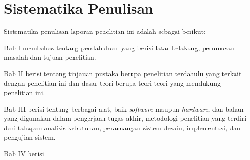 \section{Sistematika Penulisan}

Sistematika penulisan laporan penelitian ini adalah sebagai berikut:

\noindent Bab I membahas tentang pendahuluan yang berisi latar belakang, perumusan masalah 
dan tujuan penelitian. 

\noindent Bab II berisi tentang tinjauan pustaka berupa penelitian terdahulu yang terkait dengan
penelitian ini dan dasar teori berupa teori-teori yang mendukung penelitian ini.

\noindent Bab III berisi tentang berbagai alat, baik \textit{software} maupun \textit{hardware}, 
dan bahan yang digunakan dalam pengerjaan tugas akhir, metodologi penelitian yang terdiri 
dari tahapan analisis kebutuhan, perancangan sistem desain, implementasi, dan pengujian sistem.

\noindent Bab IV berisi 

